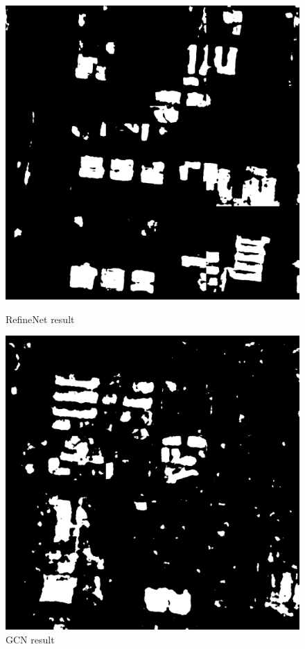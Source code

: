 \documentclass[]{IEEEtran}
\begin{document}


\newpage


\begin{figure}
	\vspace{2.5cm}
	\begin{minipage}[t]{0.5\linewidth}
		\centering
		\includegraphics[width=0.9\columnwidth]{fw}
		\caption{RefineNet result}
		\label{fig:fw}
	\end{minipage}%
	\begin{minipage}[t]{0.5\linewidth}
		\centering
		\includegraphics[width=0.9\columnwidth]{gcn}
		\caption{GCN result}
		\label{fig:rt}
	\end{minipage}
\end{figure}
\end{document}
